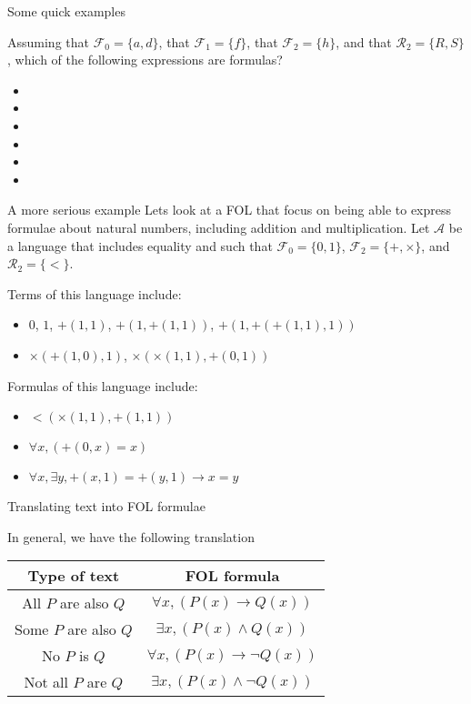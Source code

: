 \documentclass[aspectratio=169]{beamer}
\begin{document}
\begin{slide}{Some quick examples}

Assuming that $\mathcal{F}_0 = \{a,d\}$, that $\mathcal{F}_1 = \{f\}$, that $\mathcal{F}_2 = \{h\}$, and that $\mathcal{R}_2 = \{R,S\}$, which of the following expressions are formulas?

\begin{itemize}
\item {}
\item {}
\item {}
\item {}
\item {}
\item {}
\end{itemize}

\end{slide}

\begin{slide}{A more serious example}
  Lets look at a FOL that focus on being able to express formulae about natural numbers, including addition and multiplication. Let $\mathcal{A}$ be a language that includes equality and such that $\mathcal{F}_0 = \{0,1\}$, $\mathcal{F}_2 = \{+,\times\}$, and $\mathcal{R}_2 = \{<\}$.
  
  Terms of this language include:
  \begin{itemize}
  \item $0$, $1$, $+(1,1)$, $+(1,+(1,1))$, $+(1,+(+(1,1),1))$
  \item $\times(+(1,0),1)$, $\times(\times(1,1),+(0,1))$  
  \end{itemize}
  
  Formulas of this language include:
  \begin{itemize}
  \item $<(\times(1,1),+(1,1))$
  \item $\forall x, (+(0,x) = x)$
  \item $\forall x, \exists y, +(x,1) = +(y,1) \to x = y$  
  \end{itemize}


\end{slide}

\begin{slide}{Translating text into FOL formulae}
\begin{block}{In general, we have the following translation}
\begin{center}
\begin{tabular}{c|c}
Type of text &  FOL formula \\ \hline
 All $P$ are also $Q$ & $\forall x, (P(x) \to Q(x))$ \\
 Some $P$ are also $Q$ & $\exists x, (P(x) \land Q(x))$ \\
 No $P$ is $Q$ & $\forall x, (P(x) \to \neg Q(x))$ \\
 Not all $P$ are $Q$ & $\exists x, (P(x) \land \neg Q(x))$
\end{tabular}
\end{center}
\end{block}
\end{slide}
\end{document}
